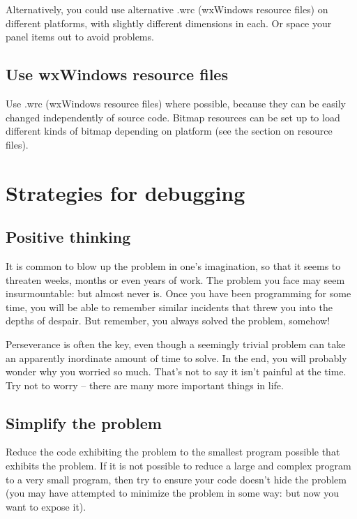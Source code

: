 Alternatively, you could use alternative .wrc (wxWindows resource files) on different
platforms, with slightly different dimensions in each. Or space your panel items out
to avoid problems.

\subsection{Use wxWindows resource files}

Use .wrc (wxWindows resource files) where possible, because they can be easily changed
independently of source code. Bitmap resources can be set up to load different
kinds of bitmap depending on platform (see the section on resource files).

\section{Strategies for debugging}\label{debugstrategies}

\subsection{Positive thinking}

It is common to blow up the problem in one's imagination, so that it seems to threaten
weeks, months or even years of work. The problem you face may seem insurmountable:
but almost never is. Once you have been programming for some time, you will be able
to remember similar incidents that threw you into the depths of despair. But
remember, you always solved the problem, somehow!

Perseverance is often the key, even though a seemingly trivial problem
can take an apparently inordinate amount of time to solve. In the end,
you will probably wonder why you worried so much. That's not to say it
isn't painful at the time. Try not to worry -- there are many more important
things in life.

\subsection{Simplify the problem}

Reduce the code exhibiting the problem to the smallest program possible
that exhibits the problem. If it is not possible to reduce a large and
complex program to a very small program, then try to ensure your code
doesn't hide the problem (you may have attempted to minimize the problem
in some way: but now you want to expose it).


